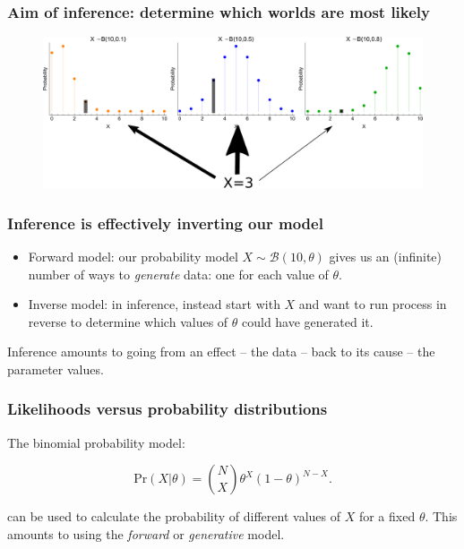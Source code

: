 \documentclass[handout]{beamer}
\begin{document}
\begin{frame}
	\frametitle{Aim of inference: determine which worlds are most likely}
	\begin{figure}[h]
		\centerline{\includegraphics[width=1\textwidth]{figures/binomial_many_worlds_inverse.pdf}}
	\end{figure}
\end{frame}

\begin{frame}
	\frametitle{Inference is effectively inverting our model}
	
	\begin{itemize}
		\item Forward model: our probability model $X\sim \mathcal{B}(10,\theta)$ gives us an (infinite) number of ways to \textit{generate} data: one for each value of $\theta$.
		\item Inverse model: in inference, instead start with $X$ and want to run process in reverse to determine which values of $\theta$ could have generated it.
	\end{itemize}
	
	Inference amounts to going from an effect -- the data -- back to its cause -- the parameter values.
	
\end{frame}

\begin{frame}
	\frametitle{Likelihoods versus probability distributions}
	
	The binomial probability model:
	
	\begin{equation}
	\text{Pr}(X|\theta) = \binom{N}{X} \theta^X (1- \theta)^{N-X}.
	\end{equation}
	
	can be used to calculate the probability of different values of $X$ for a fixed $\theta$. This amounts to using the \textit{forward} or \textit{generative} model.
	
\end{frame}
\end{document}
